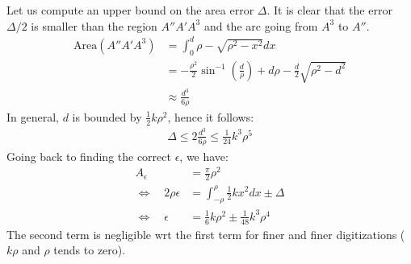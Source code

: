 \documentclass{paper}
\begin{document}
Let us compute an upper bound on the area error $\Delta$.  It is clear
that the error $\Delta/2$ is smaller than the region $A''A'A^3$ and the
arc going from $A^3$ to $A''$.
\begin{align*}
\mathrm{Area}(A''A'A^3) & = \int_0^d \rho-\sqrt{\rho^2-x^2} dx \\
& = -\frac{\rho^2}{2}\sin^{-1}(\frac{d}{\rho}) + d\rho - \frac{d}{2}\sqrt{\rho^2-d^2}\\
  & \approx \frac{d^3}{6\rho}
\end{align*}
In general, $d$ is bounded by $\frac{1}{2}k\rho^2$, hence it follows:
\begin{align*}
  \Delta \le 2\frac{d^3}{6\rho} \le \frac{1}{24} k^3 \rho^5
\end{align*}
Going back to finding the correct $\epsilon$, we have:
\begin{align*}
  A_\epsilon & = \frac{\pi}{2} \rho^2 \\
  \Leftrightarrow  \quad
  2 \rho \epsilon & = \int_{-\rho}^{\rho} \frac{1}{2}kx^2 dx \pm \Delta \\
  \Leftrightarrow  \quad
  \epsilon & =\frac{1}{6}k \rho^2 \pm \frac{1}{48} k^3 \rho^4 
\end{align*}
The second term is negligible wrt the first term for finer and finer
digitizations ($k\rho$ and $\rho$ tends to zero).

\def\Kappa{0.2}
\def\Rho{4.5}
\def\Eps{0.0}
\def\xA{-4.15}

\def\Eps{0.25*\Kappa*\Rho*\Rho}
\def\xA{-4.4}
\raisebox{5mm}{}
\end{document}
